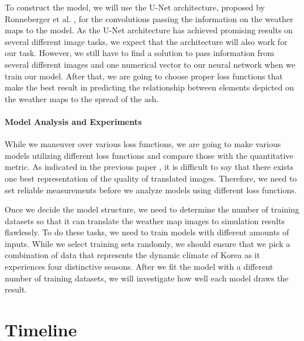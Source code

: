 \documentclass{article}
\begin{document}
\begin{doublespacing}
{  To construct the model, we will use the U-Net architecture, proposed by Ronneberger et al.
  \cite{ronneberger2015unet}, for the convolutions passing the information on the weather maps to 
  the model. As the U-Net architecture has achieved promising results on several different
  image tasks\cite{isola2016imagetoimage,james2018simtoreal}, we expect that the architecture will 
  also work for our task. However, we still have to find a solution to pass information from several
  different images and one numerical vector to our neural network when we train our model. After 
  that, we are going to choose proper loss functions that make the best result in predicting the 
  relationship between elements depicted on the weather maps to the spread of the ash.

  \paragraph{Model Analysis and Experiments}
  While we maneuver over various loss functions, we are going to make various models utilizing 
  different loss functions and compare those with the quantitative metric. As indicated in the 
  previous paper \cite{isola2016imagetoimage}, it is difficult to say that there exists one best 
  representation of the quality of translated images. Therefore, we need to set reliable 
  measurements before we analyze models using different loss functions.

  Once we decide the model structure, we need to determine the number of training datasets so that 
  it can translate the weather map images to simulation results flawlessly. To do these tasks, we 
  need to train models with different amounts of inputs. While we select training sets randomly, we 
  should ensure that we pick a combination of data that represents the dynamic climate of Korea as 
  it experiences four distinctive seasons. After we fit the model with a different number of 
  training datasets, we will investigate how well each model draws the result.
}

\section{Timeline} %
\fontsize{11pt}{11pt} \selectfont {
  The first thing we should do is to get the input. There is no available API to get the weather 
  maps and data from KMA. Therefore, we must use the interactive website provided by KMA to download
  the data; this is expected to take some time. Moreover, the calculation time for that simulation 
  was not ignorable, according to a previous experiment (it takes approximately one hour to get one 
  output through a laptop with Intel’s i5-3320M CPU). Considering that we have access to better 
  computing power than the previous test, we expect to finish data collection within two months 
  after the project's initiation.

}
\end{doublespacing}
\end{document}
